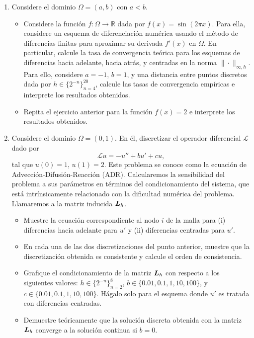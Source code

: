\documentclass{article}
\newcommand{\mat}{\matrixsym}
\newcommand{\R}{\mathbb{R}}
\newcommand{\pts}[1]{[{\bf #1 puntos}]}
\begin{document}
\begin{enumerate}
    \item Considere el dominio $\Omega=(a,b)$ con $a<b$.
            \begin{itemize}
                \item\pts{1} Considere la función $f:\Omega \to \R$ dada por $f(x) = \sin (2\pi x)$. Para ella, considere un esquema de diferenciación numérica usando el método de diferencias finitas para aproximar su derivada $f'(x)$ en $\Omega$. En particular, calcule la tasa de convergencia teórica para los esquemas de diferencias hacia adelante, hacia atrás, y centradas en la norma $\|\cdot \|_{\infty,h}$. Para ello, considere $a=-1$, $b=1$, y una distancia entre puntos discretos dada por $h  \in \{2^{-n}\}_{n=4}^{20}$, calcule las tasas de convergencia empíricas e interprete los resultados obtenidos.
                \item\pts{1} Repita el ejercicio anterior para la función $f(x) = 2$ e interprete los resultados obtenidos.
            \end{itemize}
    \item Considere el dominio $\Omega=(0,1)$. En él, discretizar el operador diferencial $\mathcal L$ dado por
            $$ \mathcal L u = - u'' + bu' + cu, $$
            tal que $u(0) = 1$, $u(1) = 2$. 
            Este problema se conoce como la ecuación de Advección-Difusión-Reacción (ADR).  Calcularemos la sensibilidad del problema a sus parámetros en términos del condicionamiento del sistema, que está intrínsicamente relacionado con la dificultad numérica del problema. Llamaremos a la matriz inducida $\mat L_h$. 
            \begin{itemize}
                \item\pts{1} Muestre la ecuación correspondiente al nodo $i$ de la malla para (i) diferencias hacia adelante para $u'$ y (ii) diferencias centradas para $u'$. 
                \item\pts{2} En cada una de las dos discretizaciones del punto anterior, muestre que la discretización obtenida es consistente y calcule el orden de consistencia.
                \item\pts{1} Grafique el condicionamiento de la matriz $\mat L_h$ con respecto a los siguientes valores: $h \in \{2^{-n}\}_{n=2}^8$, $b \in \{0.01,0.1,1,10,100\}$, y $c \in \{0.01,0.1,1,10,100\}$. Hágalo solo para el esquema donde $u'$ es tratada con diferencias centradas.
                \item\pts{2} Demuestre teóricamente que la solución discreta obtenida con la matriz $\mat L_h$ converge a la solución continua si $b=0$. 

\end{itemize}
\end{enumerate}
\end{document}
